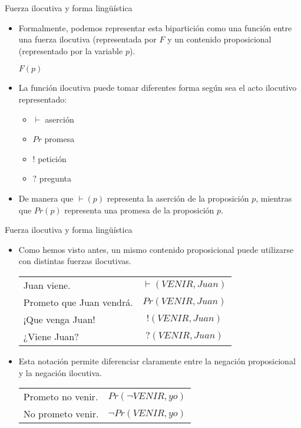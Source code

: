 \documentclass{beamer}
\begin{document}
\begin{frame}{Fuerza ilocutiva y forma lingüística}

\begin{itemize}
	\item Formalmente, podemos representar esta bipartición como una función entre una fuerza ilocutiva (representada por $F$ y un contenido proposicional (representado por la variable $p$).
	
	$F(p)$
	
	\item La función ilocutiva puede tomar diferentes forma según sea el acto ilocutivo representado: 
		\begin{itemize}
			\item $\vdash$ aserción
			\item $Pr$ promesa
			\item $!$ petición
			\item $?$ pregunta		
		\end{itemize}
	\item De manera que $\vdash (p)$ representa la aserción de la proposición $p$, mientras que $Pr (p)$ representa una promesa de la proposición $p$. 
\end{itemize}

\end{frame}

\begin{frame}{Fuerza ilocutiva y forma lingüística}

	\begin{itemize}
		\item Como hemos visto antes, un mismo contenido proposicional puede utilizarse con distintas fuerzas ilocutivas.

		\vspace{0.2cm}
		
		\begin{tabular}{l c}
			Juan viene. &  $\vdash(VENIR, Juan)$ \\ 
			Prometo que Juan vendrá. & $Pr(VENIR, Juan)$ \\ 
			¡Que venga Juan! & $!(VENIR, Juan)$  \\
			¿Viene Juan? & $?(VENIR, Juan)$  \\
		\end{tabular}
		
		\item Esta notación permite diferenciar claramente entre la negación proposicional y la negación ilocutiva.

		\vspace{0.2cm}
		
		\begin{tabular}{l c}
			Prometo no venir. & $Pr(\neg VENIR, yo)$ \\ 
			No prometo venir. & $\neg Pr(VENIR, yo)$ \\ 
		\end{tabular}
	\end{itemize}

\end{frame}
\end{document}
